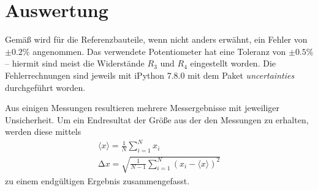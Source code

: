\section{Auswertung}
\label{sec:Auswertung}
Gemäß \cite{Versuchsanleitung} wird für die Referenzbauteile, wenn nicht anders erwähnt, ein Fehler von $\pm{0.2\%}$ angenommen. 
Das verwendete Potentiometer hat eine Toleranz von $\pm{0.5\%}$ -- hiermit sind meist die Widerstände $R_3$ und $R_4$ eingestellt worden.
Die Fehlerrechnungen sind jeweils mit iPython 7.8.0 mit dem Paket \textit{uncertainties} durchgeführt worden.

Aus einigen Messungen resultieren mehrere Messergebnisse mit jeweiliger Unsicherheit. Um ein Endresultat der Größe aus der 
den Messungen zu erhalten, werden diese mittels 
\begin{gather}
    \langle x \rangle = \frac{1}{N} \sum_{i=1}^N x_i \\
    \increment x = \sqrt{\frac{1}{N-1} \sum_{i=1}^N (x_i - \langle x \rangle)^2}
\end{gather}
zu einem endgültigen Ergebnis zusammengefasst.

\FloatBarrier
